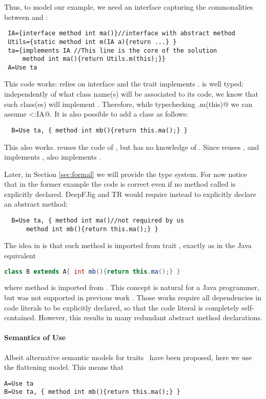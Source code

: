 Thus, to model our example, we need an interface
capturing the commonalities between \Q@A@ and \Q@B@:
\saveSpace
\begin{lstlisting}
 IA={interface method int ma()}//interface with abstract method
 Utils={static method int m(IA a){return ...} }
 ta={implements IA //This line is the core of the solution
     method int ma(){return Utils.m(this);}}
 A=Use ta
\end{lstlisting}
\saveSpace
This code works: \Q@Utils@ relies on interface \Q@IA@ and the trait \Q@ta@
implements \Q@IA@.
\Q@ta@ is well typed: independently of what class name(s) will be
associated to its code, we know that such class(es) will implement
\Q@IA@. 
Therefore, while typechecking \Q@Utils.m(this)@ we can assume
\Q@this<:IA@.
 It is also possible to add a class \Q@B@ as follows:
\saveSpace
\begin{lstlisting}
  B=Use ta, { method int mb(){return this.ma();} }
\end{lstlisting}
\saveSpace
This also works.  \Q@B@ reuses the code of \Q@ta@, but has no knowledge of \Q@A@.
Since \Q@B@ reuses \Q@ta@, and \Q@ta@ implements \Q@IA@, also \Q@B@ implements \Q@IA@. 

Later, in Section \ref{sec:formal} we will provide the type
system. 
For now notice that in the former example the code is correct even if
no method called \Q@ma@ is explicitly declared.
DeepFJig and TR would require instead to explicitly declare an abstract \Q@ma@ method:
\saveSpace
\begin{lstlisting}
  B=Use ta, { method int ma()//not required by us
      method int mb(){return this.ma();} }
\end{lstlisting}\saveSpace
\noindent
The idea in \name is that such method is imported from trait \Q@ta@, exactly as in the Java equivalent
\saveSpace\begin{lstlisting}[language=Java]
  class B extends A{ int mb(){return this.ma();} }  
\end{lstlisting}
\saveSpace
where method \Q@ma@ is imported from \Q@A@.
This concept is natural for a Java programmer, but was not supported
in previous work \cite{BETTINI2013521,deep}. Those works require all
dependencies in code literals to be explicitly declared, so that the
code literal is completely self-contained. However, this results in
many redundant abstract method declarations.

\paragraph{Semantics of Use}
Albeit alternative semantic models for traits~\cite{lagorio2009featherweight} have been proposed,
here we use the flattening model. This means that 
\saveSpace\begin{lstlisting}
A=Use ta
B=Use ta, { method int mb(){return this.ma();} }
\end{lstlisting}\saveSpace
 
